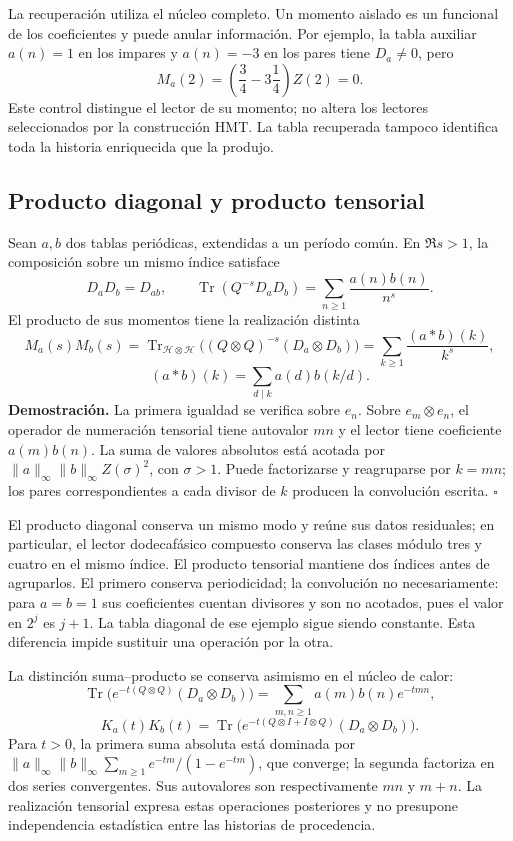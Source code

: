 La recuperación utiliza el núcleo completo. Un momento aislado es un
funcional de los coeficientes y puede anular información. Por ejemplo,
la tabla auxiliar $a(n)=1$ en los impares y $a(n)=-3$ en los pares
tiene $D_a\ne0$, pero
\[
 M_a(2)=\left(\frac34-3\frac14\right)Z(2)=0.
\]
Este control distingue el lector de su momento; no altera los lectores
seleccionados por la construcción HMT. La tabla recuperada tampoco
identifica toda la historia enriquecida que la produjo.

\subsection{Producto diagonal y producto tensorial}
Sean $a,b$ dos tablas periódicas, extendidas a un período común. En
$\Re s>1$, la composición sobre un mismo índice satisface
\[
 D_aD_b=D_{ab},\qquad
 \operatorname{Tr}(Q^{-s}D_aD_b)=\sum_{n\geq1}\frac{a(n)b(n)}{n^s}.
\]
El producto de sus momentos tiene la realización distinta
\[
 M_a(s)M_b(s)=
 \operatorname{Tr}_{\mathcal H\otimes\mathcal H}
 \bigl((Q\otimes Q)^{-s}(D_a\otimes D_b)\bigr)
 =\sum_{k\geq1}\frac{(a*b)(k)}{k^s},
\]
\[
 (a*b)(k)=\sum_{d\mid k}a(d)b(k/d).
\]
\textbf{Demostración.} La primera igualdad se verifica sobre $e_n$.
Sobre $e_m\otimes e_n$, el operador de numeración tensorial tiene
autovalor $mn$ y el lector tiene coeficiente $a(m)b(n)$. La suma de
valores absolutos está acotada por
$\|a\|_\infty\|b\|_\infty Z(\sigma)^2$, con $\sigma>1$.
Puede factorizarse y reagruparse por $k=mn$; los pares correspondientes
a cada divisor de $k$ producen la convolución escrita. \hfill$\square$

El producto diagonal conserva un mismo modo y reúne sus datos residuales;
en particular, el lector dodecafásico compuesto conserva las clases
módulo tres y cuatro en el mismo índice. El producto tensorial mantiene
dos índices antes de agruparlos. El primero conserva periodicidad; la
convolución no necesariamente: para $a=b=1$ sus coeficientes cuentan
divisores y son no acotados, pues el valor en $2^j$ es $j+1$.
La tabla diagonal de ese ejemplo sigue siendo constante. Esta diferencia
impide sustituir una operación por la otra.

La distinción suma--producto se conserva asimismo en el núcleo de calor:
\[
 \operatorname{Tr}\bigl(e^{-t(Q\otimes Q)}(D_a\otimes D_b)\bigr)
 =\sum_{m,n\geq1}a(m)b(n)e^{-tmn},
\]
\[
 K_a(t)K_b(t)=\operatorname{Tr}
 \bigl(e^{-t(Q\otimes I+I\otimes Q)}(D_a\otimes D_b)\bigr).
\]
Para $t>0$, la primera suma absoluta está dominada por
$\|a\|_\infty\|b\|_\infty\sum_{m\geq1}e^{-tm}/(1-e^{-tm})$,
que converge; la segunda factoriza en dos series convergentes. Sus
autovalores son respectivamente $mn$ y $m+n$. La realización tensorial
expresa estas operaciones posteriores y no presupone independencia
estadística entre las historias de procedencia.
